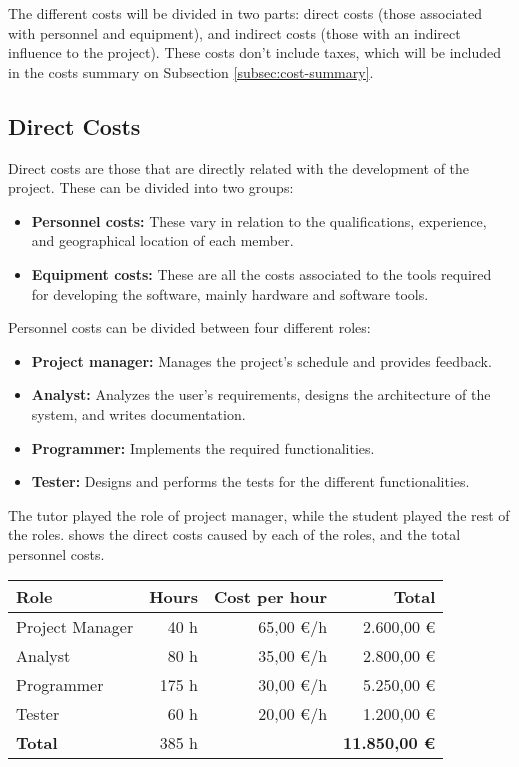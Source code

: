 \makeatother


The different costs will be divided in two parts: direct costs (those associated with personnel and equipment), and indirect costs (those with an indirect influence to the project). These costs don't include taxes, which will be included in the costs summary on Subsection \ref{subsec:cost-summary}.


\subsection{Direct Costs}
Direct costs are those that are directly related with the development of the project. These can be divided into two groups:
\begin{itemize}
  \item \textbf{Personnel costs:} These vary in relation to the qualifications, experience, and geographical location of each member.
  \item \textbf{Equipment costs:} These are all the costs associated to the tools required for developing the software, mainly hardware and software tools.
\end{itemize}

\noindent
Personnel costs can be divided between four different roles:
\begin{itemize}
  \item \textbf{Project manager:} Manages the project's schedule and provides feedback.
  \item \textbf{Analyst:} Analyzes the user's requirements, designs the architecture of the system, and writes documentation.
  \item \textbf{Programmer:} Implements the required functionalities.
  \item \textbf{Tester:} Designs and performs the tests for the different functionalities.
\end{itemize}

The tutor played the role of project manager, while the student played the rest of the roles.  shows the direct costs caused by each of the roles, and the total personnel costs.

\begin{table}[htb]
    {
      \begin{tabular}{lrrr}
        \toprule
        \textbf{Role} & \textbf{Hours} & \textbf{Cost per hour} & \textbf{Total} \\
        \midrule
        Project Manager &  40 h & 65,00 \euro/h & 2.600,00 \euro \\
        Analyst         &  80 h & 35,00 \euro/h & 2.800,00 \euro \\
        Programmer      & 175 h & 30,00 \euro/h & 5.250,00 \euro \\
        Tester          &  60 h & 20,00 \euro/h & 1.200,00 \euro \\
        \midrule
        \textbf{Total}  & 385 h &           & \textbf{11.850,00 \euro} \\
        \bottomrule
      \end{tabular}
    }
\end{table}

